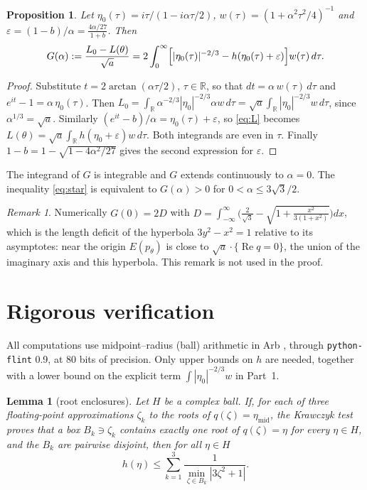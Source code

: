 \documentclass[11pt]{amsart}
\newtheorem{lemma}[theorem]{Lemma}
\newtheorem{proposition}[theorem]{Proposition}
\theoremstyle{remark}
\newtheorem{remark}[theorem]{Remark}
\newcommand{\R}{\mathbb{R}}
\begin{document}
\begin{proposition}\label{prop:G}
Let $\eta_0(\tau)=i\tau/(1-i\alpha\tau/2)$, $w(\tau)=(1+\alpha^2\tau^2/4)^{-1}$ and $\varepsilon=(1-b)/\alpha=\frac{4\alpha/27}{1+b}$. Then
\[
G(\alpha):=\frac{L_0-L(\theta)}{\sqrt a}=2\int_0^\infty\Bigl[|\eta_0(\tau)|^{-2/3}-h(\eta_0(\tau)+\varepsilon)\Bigr]w(\tau)\,d\tau .
\]
\end{proposition}

\begin{proof}
Substitute $t=2\arctan(\alpha\tau/2)$, $\tau\in\R$, so that $dt=\alpha\,w(\tau)\,d\tau$ and $e^{it}-1=\alpha\,\eta_0(\tau)$. Then $L_0=\int_\R \alpha^{-2/3}|\eta_0|^{-2/3}\alpha w\,d\tau=\sqrt a\int_\R|\eta_0|^{-2/3}w\,d\tau$, since $\alpha^{1/3}=\sqrt a$. Similarly $(e^{it}-b)/\alpha=\eta_0(\tau)+\varepsilon$, so \eqref{eq:L} becomes $L(\theta)=\sqrt a\int_\R h(\eta_0+\varepsilon)w\,d\tau$. Both integrands are even in $\tau$. Finally $1-b=1-\sqrt{1-4\alpha^2/27}$ gives the second expression for $\varepsilon$.
\end{proof}

The integrand of $G$ is integrable and $G$ extends continuously to $\alpha=0$. The inequality \eqref{eq:star} is equivalent to $G(\alpha)>0$ for $0<\alpha\le 3\sqrt3/2$.

\begin{remark}
Numerically $G(0)=2D$ with $D=\int_{-\infty}^{\infty}\bigl(\tfrac{2}{\sqrt3}-\sqrt{1+\tfrac{x^2}{3(1+x^2)}}\bigr)dx$, which is the length deficit of the hyperbola $3y^2-x^2=1$ relative to its asymptotes: near the origin $E(p_\theta)$ is close to $\sqrt a\cdot\{\operatorname{Re}q=0\}$, the union of the imaginary axis and this hyperbola. This remark is not used in the proof.
\end{remark}

\section{Rigorous verification}\label{sec:verification}

All computations use midpoint--radius (ball) arithmetic in Arb \cite{Arb}, through \texttt{python-flint} 0.9, at 80 bits of precision. Only upper bounds on $h$ are needed, together with a lower bound on the explicit term $\int|\eta_0|^{-2/3}w$ in Part~1.

\begin{lemma}[root enclosures]\label{lem:roots}
Let $H$ be a complex ball. If, for each of three floating-point approximations $\zeta_k$ to the roots of $q(\zeta)=\eta_{\mathrm{mid}}$, the Krawczyk test \cite{Kra} proves that a box $B_k\ni\zeta_k$ contains exactly one root of $q(\zeta)=\eta$ for every $\eta\in H$, and the $B_k$ are pairwise disjoint, then for all $\eta\in H$
\[
h(\eta)\le\sum_{k=1}^3\frac{1}{\min_{\zeta\in B_k}|3\zeta^2+1|}.
\]
\end{lemma}
\end{document}
